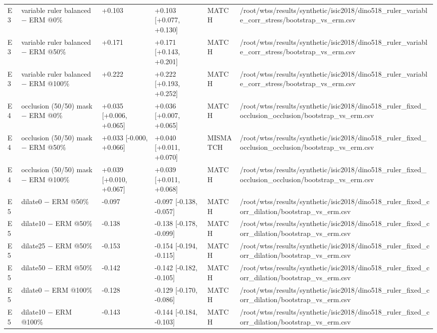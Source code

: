 {{\begin{longtable}[]{@{}llllll@{}}
E3 & variable ruler balanced − ERM @0\% & +0.103 & +0.103 {[}+0.077, +0.130{]} & MATCH & /root/wtss/results/synthetic/isic2018/dino518\_ruler\_variable\_corr\_stress/bootstrap\_vs\_erm.csv \\
E3 & variable ruler balanced − ERM @50\% & +0.171 & +0.171 {[}+0.143, +0.201{]} & MATCH & /root/wtss/results/synthetic/isic2018/dino518\_ruler\_variable\_corr\_stress/bootstrap\_vs\_erm.csv \\
E3 & variable ruler balanced − ERM @100\% & +0.222 & +0.222 {[}+0.193, +0.252{]} & MATCH & /root/wtss/results/synthetic/isic2018/dino518\_ruler\_variable\_corr\_stress/bootstrap\_vs\_erm.csv \\
E4 & occlusion (50/50) mask − ERM @0\% & +0.035 {[}+0.006, +0.065{]} & +0.036 {[}+0.007, +0.065{]} & MATCH & /root/wtss/results/synthetic/isic2018/dino518\_ruler\_fixed\_occlusion\_occlusion/bootstrap\_vs\_erm.csv \\
E4 & occlusion (50/50) mask − ERM @50\% & +0.033 {[}-0.000, +0.066{]} & +0.040 {[}+0.011, +0.070{]} & MISMATCH & /root/wtss/results/synthetic/isic2018/dino518\_ruler\_fixed\_occlusion\_occlusion/bootstrap\_vs\_erm.csv \\
E4 & occlusion (50/50) mask − ERM @100\% & +0.039 {[}+0.010, +0.067{]} & +0.039 {[}+0.011, +0.068{]} & MATCH & /root/wtss/results/synthetic/isic2018/dino518\_ruler\_fixed\_occlusion\_occlusion/bootstrap\_vs\_erm.csv \\
E5 & dilate0 − ERM @50\% & -0.097 & -0.097 {[}-0.138, -0.057{]} & MATCH & /root/wtss/results/synthetic/isic2018/dino518\_ruler\_fixed\_corr\_dilation/bootstrap\_vs\_erm.csv \\
E5 & dilate10 − ERM @50\% & -0.138 & -0.138 {[}-0.178, -0.099{]} & MATCH & /root/wtss/results/synthetic/isic2018/dino518\_ruler\_fixed\_corr\_dilation/bootstrap\_vs\_erm.csv \\
E5 & dilate25 − ERM @50\% & -0.153 & -0.154 {[}-0.194, -0.115{]} & MATCH & /root/wtss/results/synthetic/isic2018/dino518\_ruler\_fixed\_corr\_dilation/bootstrap\_vs\_erm.csv \\
E5 & dilate50 − ERM @50\% & -0.142 & -0.142 {[}-0.182, -0.105{]} & MATCH & /root/wtss/results/synthetic/isic2018/dino518\_ruler\_fixed\_corr\_dilation/bootstrap\_vs\_erm.csv \\
E5 & dilate0 − ERM @100\% & -0.128 & -0.129 {[}-0.170, -0.086{]} & MATCH & /root/wtss/results/synthetic/isic2018/dino518\_ruler\_fixed\_corr\_dilation/bootstrap\_vs\_erm.csv \\
E5 & dilate10 − ERM @100\% & -0.143 & -0.144 {[}-0.184, -0.103{]} & MATCH & /root/wtss/results/synthetic/isic2018/dino518\_ruler\_fixed\_corr\_dilation/bootstrap\_vs\_erm.csv \\

\end{longtable}}}
